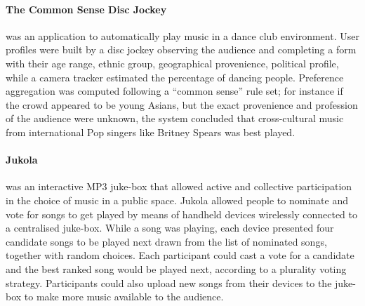 \label{par:flytrap}

\paragraph{The Common Sense Disc Jockey} %
\label{par:the_common_sense_disc_jockey_ouko02}
\cite{Ouko02} was an application to automatically play music in a dance club environment. 
User profiles were built by a disc jockey observing the audience and completing a form with their age range, ethnic group, geographical provenience, political profile, while a camera tracker estimated the percentage of dancing people.
Preference aggregation was computed following a ``common sense'' rule set; for instance if the crowd appeared to be young Asians, but the exact provenience and profession of the audience were unknown, the system concluded that cross-cultural music from international Pop singers like Britney Spears was best played.

\paragraph{Jukola} %
\label{par:jukola}
\cite{OHara04} was an interactive MP3 juke-box that allowed active and collective participation in the choice of music in a public space. 
Jukola allowed people to nominate and vote for songs to get played by means of handheld devices wirelessly connected to a centralised juke-box.
While a song was playing, each device presented four candidate songs to be played next drawn from the list of nominated songs, together with random choices.
Each participant could cast a vote for a candidate and the best ranked song would be played next, according to a plurality voting strategy.
Participants could also upload new songs from their devices to the juke-box to make more music available to the audience.

